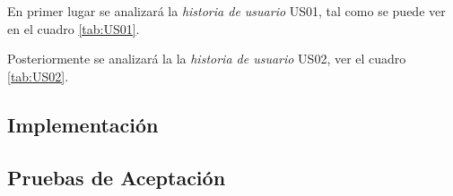 

En primer lugar se analizará la \emph{historia de usuario} US01, tal como se puede ver en el cuadro \ref{tab:US01}.

  

    


Posteriormente se analizará la la \emph{historia de usuario} US02, ver el cuadro \ref{tab:US02}.

  

    






\subsection{Implementación}

    

\subsection{Pruebas de Aceptación}





